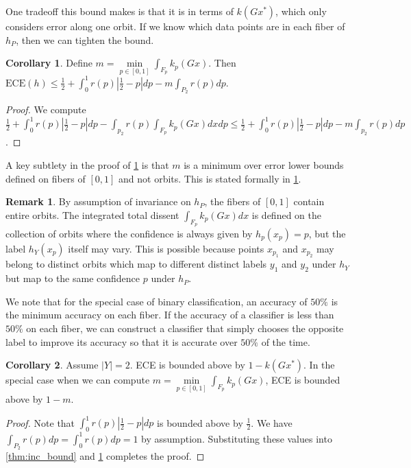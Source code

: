\documentclass[10pt]{article} %
\theoremstyle{definition}
\newtheorem{rmk}{Remark}
\newtheorem{cor}{Corollary}
\newcommand{\ECE}{\mathrm{ECE}(h)}
\begin{document}
One tradeoff this bound makes is that it is in terms of $k(Gx^*)$, which only considers error along one orbit. If we know which data points are in each fiber of $h_P$, then we can tighten the bound. 

\begin{cor} \label{cor:special_m}
Define $m = \underset{p \in [0,1]}{\min} \int_{F_p}k_p(Gx)$. Then $\ECE \leq \frac{1}{2} + \int_0^{1}r(p)|\frac{1}{2} - p|dp -  m\int_{P_2}r(p) dp $.
\end{cor}

\begin{proof}
We compute $\frac{1}{2}  +\int_0^{1}r(p)|\frac{1}{2} - p|dp -  \int_{p_2}r(p)\int_{F_p}k_p(Gx) dxdp  \leq \frac{1}{2} + \int_0^{1}r(p)|\frac{1}{2} - p|dp -  m\int_{p_2}r(p) dp$.
\end{proof}

A key subtlety in the proof of \cref{cor:special_m} is that $m$ is a minimum over error lower bounds defined on fibers of $[0,1]$ and not orbits. This is stated formally in \cref{rmk:fib}.

\begin{rmk} \label{rmk:fib}
By assumption of invariance on $h_P$, the fibers of $[0,1]$ contain entire orbits. The integrated total dissent $\int_{F_p}k_p(Gx)dx$ is defined on the collection of orbits where the confidence is always given by $h_p(x_p) = p$, but the label $h_Y(x_p)$ itself may vary. This is possible because points $x_{p_1}$ and $x_{p_2}$ may belong to distinct orbits which map to different distinct labels $y_1$ and $y_2$ under $h_Y$ but map to the same confidence $p$ under $h_P$.
\end{rmk}

We note that for the special case of binary classification, an accuracy of $50\%$ is the minimum accuracy on each fiber. If the accuracy of a classifier is less than $50\%$ on each fiber, we can construct a classifier that simply chooses the opposite label to improve its accuracy so that it is accurate over $50\%$ of the time.

\begin{cor} \label{cor:binary_cor} Assume $|Y| = 2$. ECE is bounded above by $1-k(Gx^*)$. In the special case when we can compute $m = \underset{p \in [0,1]}{\min} \int_{F_p}k_p(Gx)$, ECE is bounded above by $1-m$.
\end{cor}

\begin{proof}
Note that $\int_0^{1}r(p)|\frac{1}{2} - p|dp$ is bounded above by $\frac{1}{2}$. We have $\int_{P_2}r(p)dp = \int_0^1r(p)dp = 1$ by assumption. Substituting these values into \cref{thm:inc_bound} and \cref{cor:special_m} completes the proof.
\end{proof}
\end{document}
